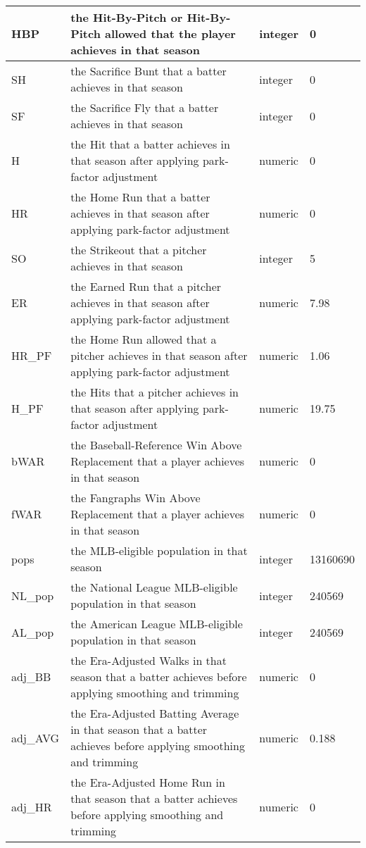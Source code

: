 \documentclass[11pt]{article}
\begin{document}
\begin{table}[H]
{\begin{tabular}{|l|l|l|l|}
 \hline
 HBP & the Hit-By-Pitch or Hit-By-Pitch allowed that the player achieves in that season & integer & 0 \\
 \hline
 SH & the Sacrifice Bunt that a batter achieves in that season & integer & 0 \\
 \hline
 SF & the Sacrifice Fly that a batter achieves in that season & integer & 0 \\
 \hline
 H & the Hit that a batter achieves in that season after applying park-factor adjustment & numeric & 0 \\
 \hline
 HR & the Home Run that a batter achieves in that season after applying park-factor adjustment & numeric & 0 \\
 \hline
 SO & the Strikeout that a pitcher achieves in that season & integer & 5 \\
 \hline
 ER & the Earned Run that a pitcher achieves in that season after applying park-factor adjustment & numeric & 7.98 \\
 \hline
 HR\_PF & the Home Run allowed that a pitcher achieves in that season after applying park-factor adjustment & numeric & 1.06 \\
 \hline
 H\_PF & the Hits that a pitcher achieves in that season after applying park-factor adjustment & numeric & 19.75 \\
 \hline
 bWAR & the Baseball-Reference Win Above Replacement that a player achieves in that season & numeric & 0 \\
 \hline
 fWAR & the Fangraphs Win Above Replacement that a player achieves in that season & numeric & 0 \\
 \hline
 pops & the MLB-eligible population in that season & integer & 13160690 \\
 \hline
 NL\_pop & the National League MLB-eligible population in that season & integer & 240569 \\
 \hline
 AL\_pop & the American League MLB-eligible population in that season & integer & 240569 \\
 \hline
 adj\_BB & the Era-Adjusted Walks in that season that a batter achieves before applying smoothing and trimming & numeric & 0 \\
 \hline
 adj\_AVG & the Era-Adjusted Batting Average in that season that a batter achieves before applying smoothing and trimming & numeric & 0.188 \\
 \hline
 adj\_HR & the Era-Adjusted Home Run in that season that a batter achieves before applying smoothing and trimming & numeric & 0 \\

\end{tabular}}
\end{table}
\end{document}
